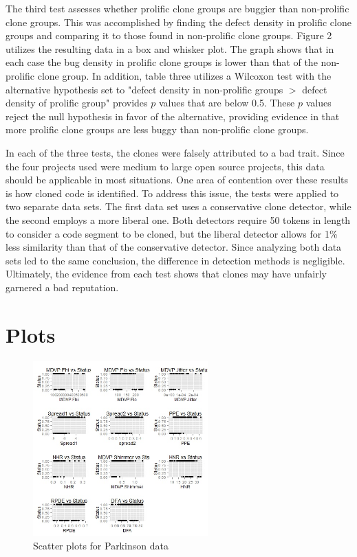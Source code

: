 \documentclass{article}
\begin{document}
The third test assesses whether prolific clone groups are buggier than non-prolific clone groups.
This was accomplished by finding the defect density in prolific clone groups and comparing it to
those found in non-prolific clone groups. Figure 2 utilizes the resulting data in a box and whisker
plot. The graph shows that in each case the bug density in prolific clone groups is lower than that
of the non-prolific clone group. In addition, table three utilizes a Wilcoxon test with the alternative
hypothesis set to "defect density in non-prolific groups $>$ defect density of prolific group" provides
$p$ values that are below 0.5. These $p$ values reject the null hypothesis in favor of the alternative,
providing evidence in that more prolific clone groups are less buggy than non-prolific clone groups.

In each of the three tests, the clones were falsely attributed to a bad trait. Since the four
projects used were medium to large open source projects, this data should be applicable
in most situations. One area of contention over these results is how cloned code is identified.
To address this issue, the tests were applied to two separate data sets. The first data set
uses a conservative clone detector, while the second employs a more liberal one. Both detectors
require 50 tokens in length to consider a code segment to be cloned, but the liberal detector
allows for 1\% less similarity than that of the conservative detector. Since analyzing both
data sets led to the same conclusion, the difference in detection methods is negligible. Ultimately,
the evidence from each test shows that clones may have unfairly garnered a bad reputation.

\pagebreak

\appendix
\section{Plots}
\begin{figure}[h]
  \centering
  \includegraphics[width=0.6\textwidth]{parkinson.jpg}
  \caption{Scatter plots for Parkinson data}
  \label{fig:parkinson_scatters}
\end{figure}
\end{document}
